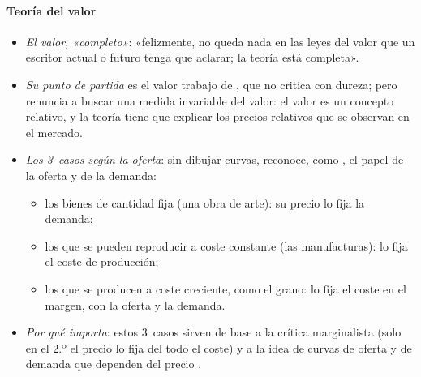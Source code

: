 \documentclass[11pt]{article}
\begin{document}
\paragraph{Teoría del valor}\label{sec:mill-valor}
\begin{itemize}
\item \emph{El valor, «completo»}: «felizmente, no queda nada en las leyes del valor que un escritor actual o futuro tenga que aclarar; la teoría está completa»\nocite{Mill1848Principles}.
\item \emph{Su punto de partida} es el valor trabajo de , que no critica con dureza; pero renuncia a buscar una medida invariable del valor: el valor es un concepto relativo, y la teoría tiene que explicar los precios relativos que se observan en el mercado.
\item \emph{Los 3~casos según la oferta}: sin dibujar curvas, reconoce, como , el papel de la oferta y de la demanda:
  \begin{itemize}
  \item los bienes de cantidad fija (una obra de arte): su precio lo fija la demanda;
  \item los que se pueden reproducir a coste constante (las manufacturas): lo fija el coste de producción;
  \item los que se producen a coste creciente, como el grano: lo fija el coste en el margen, con la oferta y la demanda.
  \end{itemize}
\item \emph{Por qué importa}: estos 3~casos sirven de base a la crítica marginalista (solo en el 2.º el precio lo fija del todo el coste) y a la idea de curvas de oferta y de demanda que dependen del precio .
\end{itemize}
\end{document}
